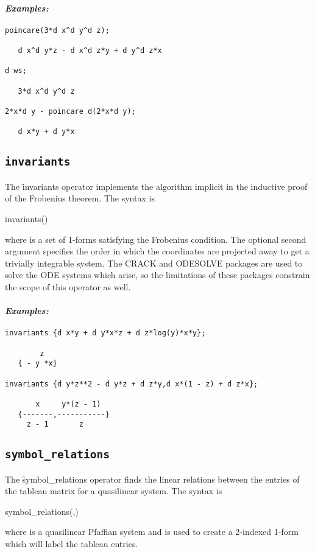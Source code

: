 \paragraph{\it Examples:}
\begin{verbatim}
poincare(3*d x^d y^d z);

   d x^d y*z - d x^d z*y + d y^d z*x 

d ws;

   3*d x^d y^d z

2*x*d y - poincare d(2*x*d y);

   d x*y + d y*x
\end{verbatim}


\subsection{\tt invariants}
\label{invariants}

The \f{invariants} operator implements the algorithm implicit in the
inductive proof of the Frobenius theorem. The syntax is
\begin{syntax}
	invariants()
\end{syntax}
where  is a set of 1-forms satisfying the Frobenius condition.
The optional second argument specifies the order in which the coordinates
are projected away to get a trivially integrable system.  The CRACK and
ODESOLVE packages are used to solve the ODE systems which arise, so the
limitations of these packages constrain the scope of this operator as well.

\paragraph{\it Examples:}
\begin{verbatim}
invariants {d x*y + d y*x*z + d z*log(y)*x*y};

        z
   { - y *x}

invariants {d y*z**2 - d y*z + d z*y,d x*(1 - z) + d z*x};

       x     y*(z - 1)
   {-------,-----------}
     z - 1       z
\end{verbatim}


\subsection{\tt symbol\_relations}
\label{symbol_relations}

The \f{symbol\_relations} operator finds the linear relations between the
entries of the tableau matrix for a quasilinear system. The syntax is
\begin{syntax}
	symbol\_relations(,)
\end{syntax}
where  is a quasilinear Pfaffian system and  is
used to create a 2-indexed 1-form which will label the tableau entries.

